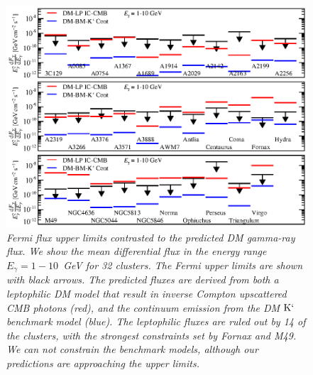 \documentclass[10pt,aps,pra,reprint,amsmath,amsfonts,amssymb,showpacs]{revtex4-1}
\newcommand{\rmn}{\mathrm}
\newcommand{\Km}{\rmn{K}`}
\begin{document}
\begin{figure}
\begin{minipage}{2.0\columnwidth}
  \includegraphics[width=0.99\columnwidth]{figures/Fermi.comp.DM.eps}
  \caption{\it Fermi flux upper limits contrasted to the predicted DM
    gamma-ray flux. We show the mean differential flux in the energy
    range $E_\gamma=1-10$~GeV for 32 clusters. The Fermi upper limits
    are shown with black arrows. The predicted fluxes are derived from
    both a leptophilic DM model that result in inverse Compton
    upscattered CMB photons (red), and the continuum emission from the
    DM $\Km$ benchmark model (blue). The leptophilic fluxes are ruled
    out by 14 of the clusters, with the strongest constraints set by
    Fornax and M49. We can not constrain the benchmark models,
    although our predictions are approaching the upper limits.}
 \label{fig14}
\end{minipage}
\end{figure}
\end{document}
